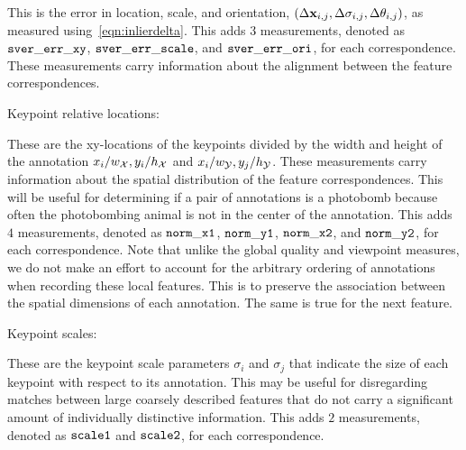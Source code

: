 \begin{itemln}
        This is the error in location, scale, and orientation, $( %
            \Delta \pt_{i, j}, %
            \Delta \scale_{i, j}, %
        \Delta \ori_{i, j})$, as measured using~\cref{eqn:inlierdelta}.
        This adds $3$ measurements, denoted as $\tt{sver\_err\_xy}$, $\tt{sver\_err\_scale}$, and
          $\tt{sver\_err\_ori}$, for each correspondence.
        These measurements carry information about the alignment between the feature correspondences.

    \item Keypoint relative locations:

        These are the xy-locations of the keypoints divided by the width and height of the annotation  %
        $x_i / w_{\mathcal{X}}, y_i / h_{\mathcal{X}}$ and $x_i / w_{\mathcal{Y}}, y_j / h_{\mathcal{Y}}$.
        These measurements carry information about the spatial distribution of the feature correspondences.
        This will be useful for determining if a pair of annotations is a photobomb because often the
          photobombing animal is not in the center of the annotation.
        This adds $4$ measurements, denoted as $\tt{norm\_x1}$, $\tt{norm\_y1}$, $\tt{norm\_x2}$, and
          $\tt{norm\_y2}$, for each correspondence.
        Note that unlike the global quality and viewpoint measures, we do not make an effort to account for the
          arbitrary ordering of annotations when recording these local features.
        This is to preserve the association between the spatial dimensions of each annotation.
        The same is true for the next feature.

    \item Keypoint scales:

        These are the keypoint scale parameters $\sigma_i$ and $\sigma_j$ that indicate the size of each keypoint
          with respect to its annotation.
        This may be useful for disregarding matches between large coarsely described features that do not carry a
          significant amount of individually distinctive information.
        This adds $2$ measurements, denoted as $\tt{scale1}$ and $\tt{scale2}$, for each correspondence.

\end{itemln}

